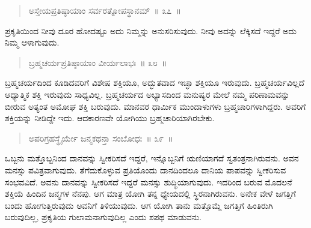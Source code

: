 \vspace{-0.4cm}

\begin{verse}
ಅಸ್ತೇಯಪ್ರತಿಷ್ಠಾಯಾಂ ಸರ್ವರತ್ನೋಪಸ್ಥಾನಮ್​~॥ ೩೭~॥
\end{verse}

\vspace{-0.35cm}


ಪ್ರಕೃತಿಯಿಂದ ನೀವು ದೂರ ಹೋದಷ್ಟೂ ಅದು ನಿಮ್ಮನ್ನು ಅನುಸರಿಸುವುದು. ನೀವು ಅದನ್ನು ಲೆಕ್ಕಿಸದೆ ಇದ್ದರೆ ಅದು ನಿಮ್ಮ ಆಳಾಗುವುದು. 

\eject

\begin{verse}
ಬ್ರಹ್ಮಚರ್ಯಪ್ರತಿಷ್ಠಾಯಾಂ ವೀರ್ಯಲಾಭಃ~॥ ೩೮~॥
\end{verse}

\vspace{-0.35cm}


ಬ್ರಹ್ಮಚರ್ಯದಿಂದ ಕೂಡಿದವರಿಗೆ ವಿಶೇಷ ಶಕ್ತಿಯೂ, ಅದ್ಭುತವಾದ ಇಚ್ಛಾ ಶಕ್ತಿಯೂ ಇರುವುದು. ಬ್ರಹ್ಮಚರ್ಯವಿಲ್ಲದೆ ಆಧ್ಯಾತ್ಮಿಕ ಶಕ್ತಿ ಇರುವುದು ಸಾಧ್ಯವಿಲ್ಲ. ಬ್ರಹ್ಮಚರ್ಯದ ಅಭ್ಯಾಸದಿಂದ ಮನುಷ್ಯರ ಮೇಲೆ ನಮ್ಮ ಪರಿಣಾಮವನ್ನು ಬೀರುವ ಅತ್ಯಂತ ಅಮೋಘ ಶಕ್ತಿ ಬರುವುದು. ಮಾನವರ ಧಾರ್ಮಿಕ ಮುಂದಾಳುಗಳು ಬ್ರಹ್ಮಚಾರಿಗಳಾಗಿದ್ದರು. ಅವರಿಗೆ ಶಕ್ತಿಯನ್ನು ನೀಡಿದ್ದೇ ಇದು. ಆದಕಾರಣವೇ ಯೋಗಿಯು ಬ್ರಹ್ಮಚಾರಿಯಾಗಿರಬೇಕು. 

\vspace{-0.35cm}

\begin{verse}
ಅಪರಿಗ್ರಹಸ್ಥೈರ್ಯೇ ಜನ್ಮಕಥನ್ತಾ ಸಂಬೋಧಃ~॥ ೩೯~॥
\end{verse}

\vspace{-0.35cm}


ಒಬ್ಬನು ಮತ್ತೊಬ್ಬನಿಂದ ದಾನವನ್ನು ಸ್ವೀಕರಿಸದೆ ಇದ್ದರೆ, ಇನ್ನೊಬ್ಬನಿಗೆ ಋಣಿಯಾಗದೆ ಸ್ವತಂತ್ರನಾಗಿರುವನು. ಅವನ ಮನಸ್ಸು ಪವಿತ್ರವಾಗುವುದು. ತೆಗೆದುಕೊಳ್ಳುವ ಪ್ರತಿಯೊಂದು ದಾನದಿಂದಲೂ ದಾನಿಯ ಪಾಪವನ್ನು ಸ್ವೀಕರಿಸುವ ಸಂಭವವಿದೆ. ಅವನು ದಾನವನ್ನು ಸ್ವೀಕರಿಸದೆ ಇದ್ದರೆ ಮನಸ್ಸು ಶುದ್ಧಿಯಾಗುವುದು. ಇದರಿಂದ ಬರುವ ಮೊದಲನೆ ಶಕ್ತಿಯೆ ಹಿಂದಿನ ಜನ್ಮಗಳ ನೆನಪು. ಆಗ ಮಾತ್ರ ಯೋಗಿ ತನ್ನ ಧ್ಯೇಯದಲ್ಲಿ ಸ್ಥಿರನಾಗಿರುವನು. ಅನೇಕ ವೇಳೆ ಜಗತ್ತಿಗೆ ಬಂದು ಹೋಗುತ್ತಿರುವುದು ಅವನಿಗೆ ತಿಳಿಯುವುದು. ಆಗ ಯೋಗಿ ತಾನು ಮತ್ತೊಮ್ಮೆ ಜಗತ್ತಿಗೆ ಹಿಂತಿರುಗಿ ಬರುವುದಿಲ್ಲ, ಪ್ರಕೃತಿಯ ಗುಲಾಮನಾಗುವುದಿಲ್ಲ ಎಂದು ಶಪಥ ಮಾಡುವನು. 

\vspace{-0.35cm}

